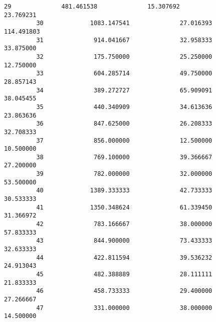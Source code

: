 \documentclass[11pt]{article}
\begin{document}
\begin{Verbatim}[commandchars=\\\{\}]
         29              481.461538              15.307692               23.769231   
         30             1083.147541              27.016393              114.491803   
         31              914.041667              32.958333               33.875000   
         32              175.750000              25.250000               12.750000   
         33              604.285714              49.750000               28.857143   
         34              389.272727              65.909091               38.045455   
         35              440.340909              34.613636               23.863636   
         36              847.625000              26.208333               32.708333   
         37              856.000000              12.500000               10.500000   
         38              769.100000              39.366667               27.200000   
         39              782.000000              32.000000               53.500000   
         40             1389.333333              42.733333               30.533333   
         41             1350.348624              61.339450               31.366972   
         42              783.166667              38.000000               57.833333   
         43              844.900000              73.433333               32.633333   
         44              422.811594              39.536232               24.913043   
         45              482.388889              28.111111               21.833333   
         46              458.733333              29.400000               27.266667   
         47              331.000000              38.000000               14.500000   
         

\end{Verbatim}
\end{document}

